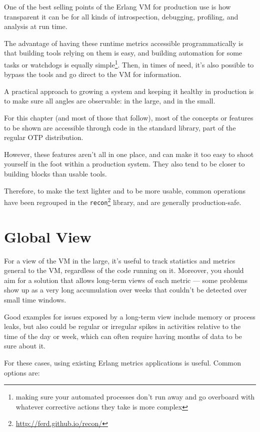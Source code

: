 \documentclass[11pt, oneside]{book}   	%
\newcommand{\otpapp}[1]{\Verb`#1`}
\begin{document}
One of the best selling points of the Erlang VM for production use is how transparent it can be for all kinds of introspection, debugging, profiling, and analysis at run time.

The advantage of having these runtime metrics accessible programmatically is that building tools relying on them is easy, and building automation for some tasks or watchdogs is equally simple\footnote{making sure your automated processes don't run away and go overboard with whatever corrective actions they take is more complex}. Then, in times of need, it's also possible to bypass the tools and go direct to the VM for information.

A practical approach to growing a system and keeping it healthy in production is to make sure all angles are observable: in the large, and in the small.

For this chapter (and most of those that follow), most of the concepts or features to be shown are accessible through code in the standard library, part of the regular OTP distribution. 

However, these features aren't all in one place, and can make it too easy to shoot yourself in the foot within a production system. They also tend to be closer to building blocks than usable tools.

Therefore, to make the text lighter and to be more usable, common operations have been regrouped in the \otpapp{recon}\footnote{\href{http://ferd.github.io/recon/}{http://ferd.github.io/recon/}} library, and are generally production-safe.

\section{Global View}
\label{sec:global-view}

For a view of the VM in the large, it's useful to track statistics and metrics general to the VM, regardless of the code running on it. Moreover, you should aim for a solution that allows long-term views of each metric — some problems show up as a very long accumulation over weeks that couldn't be detected over small time windows.

Good examples for issues exposed by a long-term view include memory or process leaks, but also could be regular or irregular spikes in activities relative to the time of the day or week, which can often require having months of data to be sure about it.

For these cases, using existing Erlang metrics applications is useful. Common options are:
\end{document}
